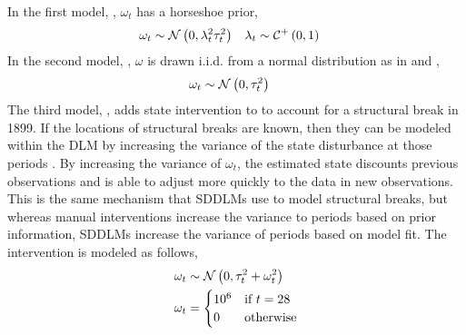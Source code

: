 \documentclass{article}
\begin{document}
In the first model, , $\omega_{t}$ has a horseshoe prior,
\begin{equation}
  \label{eq:22}
  \begin{aligned}[t]
    \omega_{t} & \sim \mathcal{N}\left(0, \lambda^{2}_{t} \tau_{t}^{2}\right) & \lambda_{t} & \sim \mathcal{C}^{+}\left(0, 1\right)
  \end{aligned}
\end{equation}
In the second model, , $\omega$ is  drawn i.i.d. from a normal distribution as in \textcite{DurbinKoopman2001} and \textcite{petris2011state},
\begin{equation}
  \label{eq:9}
  \begin{aligned}[t]
    \omega_{t} & \sim \mathcal{N}\left(0, \tau_{t}^{2}\right)
  \end{aligned}
\end{equation}
The third model, , adds state intervention to  to account for a structural break in 1899.
If the locations of structural breaks are known, then they can be modeled within the DLM by increasing the variance of the state disturbance at those periods \textcite[Chapter 11][]{WestHarrison1997}.
By increasing the variance of $\omega_{t}$, the estimated state discounts previous observations and is able to adjust more quickly to the data in new observations.
This is the same mechanism that SDDLMs use to model structural breaks, but whereas manual interventions increase the variance to periods based on prior information, SDDLMs increase the variance of periods based on model fit.
The intervention is modeled as follows,
\begin{equation}
  \label{eq:12}
  \begin{aligned}[t]
    \omega_{t} & \sim \mathcal{N}\left(0, \tau_{t}^{2} + \omega_{t}^{2}\right) \\
    \omega_{t} & = 
    \begin{cases}
      10^{6} & \text{if $t = 28$} \\
      0 & \text{otherwise}
    \end{cases}
  \end{aligned}
\end{equation}
\end{document}
